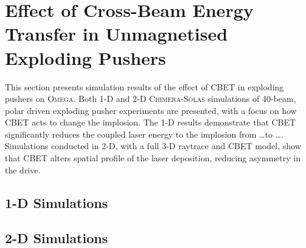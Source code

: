\section{Effect of Cross-Beam Energy Transfer in Unmagnetised Exploding Pushers}%
\label{sec:Res2_CBET_expl}

This section presents simulation results of the effect of \ac{CBET} in exploding pushers on \textsc{Omega}.
Both 1-D and 2-D \textsc{Chimera}-\textsc{Solas} simulations of 40-beam, polar driven exploding pusher experiments are presented, with a focus on how \ac{CBET} acts to change the implosion.
The 1-D results demonstrate that \ac{CBET} significantly reduces the coupled laser energy to the implosion from \dots to \dots.
Simulations conducted in 2-D, with a full 3-D raytrace and \ac{CBET} model, show that \ac{CBET} alters spatial profile of the laser deposition, reducing asymmetry in the drive.


\subsection{1-D Simulations}%
\label{sec:Res2_expl1D}



\subsection{2-D Simulations}%
\label{sec:Res2_expl2D}


